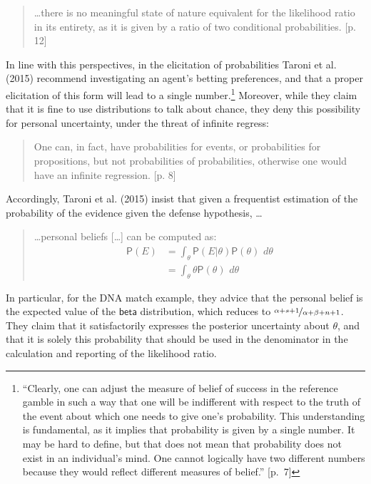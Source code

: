 \documentclass[
  10pt,
  dvipsnames,enabledeprecatedfontcommands]{scrartcl}
\newcommand{\pr}[1]{\mathsf{P}(#1)}
\newcommand{\s}[1]{\mbox{$\mathsf{#1}$}}
\begin{document}
\begin{quote}
\dots there is no meaningful state of nature equivalent for the likelihood ratio in its entirety, as it is given by a ratio of two conditional probabilities. [p. 12]
\end{quote}

\noindent In line with this perspectives, in the elicitation of
probabilities Taroni et al. (2015) recommend investigating an agent's
betting preferences, and that a proper elicitation of this form will
lead to a single number.\footnote{``Clearly, one can adjust the measure
  of belief of success in the reference gamble in such a way that one
  will be indifferent with respect to the truth of the event about which
  one needs to give one's probability. This understanding is
  fundamental, as it implies that probability is given by a single
  number. It may be hard to define, but that does not mean that
  probability does not exist in an individual's mind. One cannot
  logically have two different numbers because they would reflect
  different measures of belief.'' {[}p.~7{]}} \noindent Moreover, while
they claim that it is fine to use distributions to talk about chance,
they deny this possibility for personal uncertainty, under the threat of
infinite regress:

\begin{quote}
One can, in fact, have probabilities for events, or probabilities for propositions, but not probabilities of probabilities, otherwise one would have an infinite regression. [p. 8]
\end{quote}

\noindent Accordingly, Taroni et al. (2015) insist that given a
frequentist estimation of the probability of the evidence given the
defense hypothesis, \dots

\begin{quote}
\dots personal beliefs [\dots] can be computed as:
\begin{align*}\pr{E} & = \int_{\theta} \pr{E\vert \theta} \pr{\theta}\,\, d\theta \\
& =  \int_\theta  \theta \pr{\theta}\,\, d\theta
\end{align*}
\end{quote}

\noindent In particular, for the DNA match example, they advice that the
personal belief is the expected value of the \(\s{beta}\) distribution,
which reduces to \(\nicefrac{\alpha + s + 1}{\alpha + \beta +n + 1}\).
They claim that it satisfactorily expresses the posterior uncertainty
about \(\theta\), and that it is solely this probability that should be
used in the denominator in the calculation and reporting of the
likelihood ratio.
\end{document}
